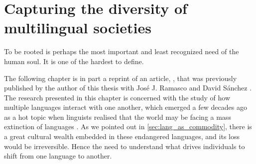 \documentclass[../thesis.tex]{subfiles}
\begin{document}
\chapter{Capturing the diversity of multilingual societies}
\label{ch:multiling}

\epigraph{
  To be rooted is perhaps the most important and least recognized need of the
  human soul. It is one of the hardest to define.
}{
}

The following chapter is in part a reprint of an article,
, that was previously published by the author of
this thesis with Jos\'{e} J. Ramasco and David S\'{a}nchez
\cite{LoufCapturingDiversity2021}.
\\

The research presented in this chapter is concerned with the study of how multiple
languages interact with one another, which emerged a few decades ago as a hot topic when
linguists realised that the world may be facing a mass extinction of languages
\cite{KraussWorldLanguages1992,GrenobleEndangeredLanguages1998,CrystalLanguageDeath2000}.
As we pointed out in \cref{sec:lang_as_commodity}, there is a great cultural wealth
embedded in these endangered languages, and its loss would be irreversible. Hence
the need to understand what drives individuals to shift from one language to another.
\end{document}
